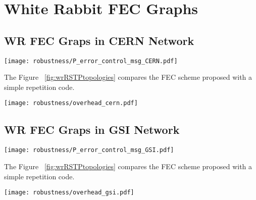\section{White Rabbit FEC Graphs}
\label{app:wr_fec_graphs}


\subsection{WR FEC Graps in  CERN Network}

\begin{center}
        \texttt{[image: robustness/P\_error\_control\_msg\_CERN.pdf]}
         \label{fig:wrRSTPtopologies}
\end{center}

The Figure ~\ref{fig:wrRSTPtopologies} compares the FEC scheme proposed with a simple repetition code.


\begin{center}
        \texttt{[image: robustness/overhead\_cern.pdf]}
         \label{fig:wrRSTPtopologies}
\end{center}



\subsection{WR FEC Graps in  GSI Network}


\begin{center}
        \texttt{[image: robustness/P\_error\_control\_msg\_GSI.pdf]}
         \label{fig:wrRSTPtopologies}
\end{center}


The Figure ~\ref{fig:wrRSTPtopologies} compares the FEC scheme proposed with a simple repetition code.

\begin{center}
        \texttt{[image: robustness/overhead\_gsi.pdf]}
         \label{fig:wrRSTPtopologies}
\end{center}

\label{app:wr_fec_Graphs}









